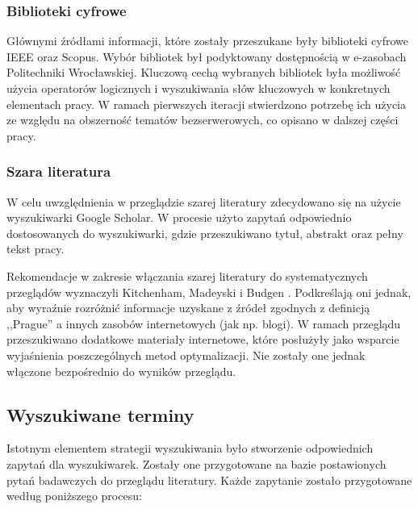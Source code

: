 \subsubsection{Biblioteki cyfrowe}

Głównymi źródłami informacji, które zostały przeszukane były biblioteki cyfrowe IEEE oraz Scopus. 
Wybór bibliotek był podyktowany dostępnością w e-zasobach Politechniki Wrocławskiej. 
Kluczową cechą wybranych bibliotek była możliwość użycia operatorów logicznych i wyszukiwania słów kluczowych w konkretnych elementach pracy.
W ramach pierwszych iteracji stwierdzono potrzebę ich użycia ze względu na obszerność tematów bezserwerowych, co opisano w dalszej części pracy.

\subsubsection{Szara literatura}

W celu uwzględnienia w przeglądzie szarej literatury zdecydowano się na użycie wyszukiwarki Google Scholar.
W procesie użyto zapytań odpowiednio dostosowanych do wyszukiwarki, gdzie przeszukiwano tytuł, abstrakt oraz pełny tekst pracy.

Rekomendacje w zakresie włączania szarej literatury do systematycznych przeglądów wyznaczyli Kitchenham, Madeyski i Budgen \cite{9754223}.
Podkreślają oni jednak, aby wyraźnie rozróżnić informacje uzyskane z źródeł zgodnych z definicją ,,Prague'' a innych zasobów internetowych (jak np. blogi).
W ramach przeglądu przeszukiwano dodatkowe materiały internetowe, które posłużyły jako wsparcie wyjaśnienia poszczególnych metod optymalizacji.
Nie zostały one jednak włączone bezpośrednio do wyników przeglądu.

\subsection{Wyszukiwane terminy}\label{chapter:wyszukiwane_terminy}

Istotnym elementem strategii wyszukiwania było stworzenie odpowiednich zapytań dla wyszukiwarek. 
Zostały one przygotowane na bazie postawionych pytań badawczych do przeglądu literatury.
Każde zapytanie zostało przygotowane według poniższego procesu:

